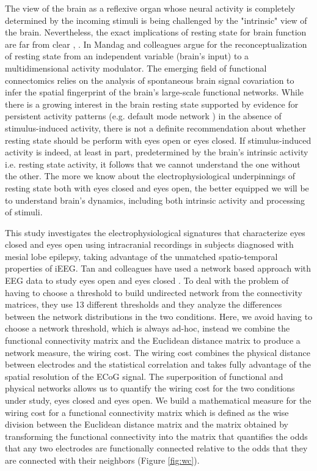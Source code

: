 \documentclass[11pt, onecolumn]{article}
\begin{document}
The view of the brain as a reflexive organ whose neural activity is completely determined by the incoming stimuli is being challenged by the "intrinsic" view of the brain. Nevertheless, the exact implications of resting state for brain function are far from clear \citep{schneider2008resting}, \citep{northoff2010brain}. 
In \citep{maandag2007energetics} Mandag and colleagues argue for the reconceptualization of resting state from an independent variable (brain’s input) to a multidimensional activity modulator. The emerging field of functional connectomics relies on the analysis of spontaneous brain signal covariation to infer the spatial fingerprint of the brain's large-scale functional networks. While there is a growing interest in the brain resting state supported by evidence for persistent activity patterns (e.g. default mode network \citep{greicius2004default}) in the absence of stimulus-induced activity, there is not a definite recommendation about whether resting state should be perform with eyes open or eyes closed. If stimulus-induced activity is indeed, at least in part, predetermined by the brain’s intrinsic activity i.e. resting state activity, it follows that we cannot understand the one without the other. The more we know about the electrophysiological underpinnings of resting state both with eyes closed and eyes open, the better equipped we will be to understand brain's dynamics, including both intrinsic activity and processing of stimuli. 

This study investigates the electrophysiological signatures that characterize eyes closed and eyes open using intracranial recordings in subjects diagnosed with mesial lobe epilepsy, taking advantage of the unmatched spatio-temporal properties of iEEG. %
Tan and colleagues have used a network based approach with EEG data to study eyes open and eyes closed \citep{tan2013difference}. To deal with the problem of having to choose a threshold to build undirected network from the connectivity matrices, they use 13 different thresholds and they analyze the differences between the network distributions in the two conditions. 
Here, we avoid having to choose a network threshold, which is always ad-hoc, instead we combine the functional connectivity matrix and the Euclidean distance matrix to produce a network measure, the wiring cost. The wiring cost combines the physical distance between electrodes and the statistical correlation and takes fully advantage of the spatial resolution of the ECoG signal. The superposition of functional and physical networks allows us to quantify the wiring cost for the two conditions under study, eyes closed and eyes open. %
We build a mathematical measure for the wiring cost for a functional connectivity matrix which is defined as the wise division between the Euclidean distance matrix and the matrix obtained by transforming the functional connectivity into the matrix that quantifies the odds that any two electrodes are functionally connected relative to the odds that they are connected with their neighbors (Figure \ref{fig:wc}).
\end{document}
